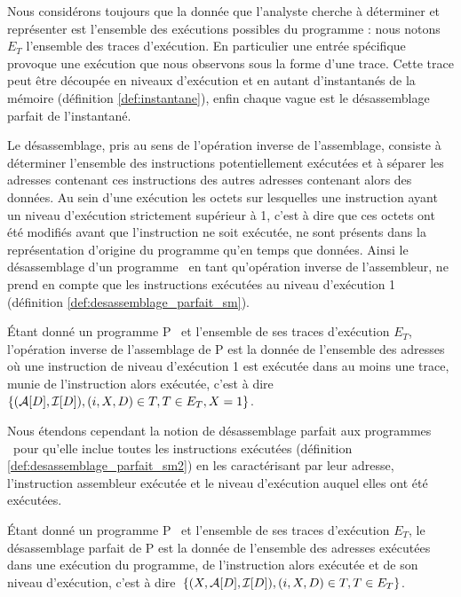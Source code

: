 Nous considérons toujours que la donnée que l'analyste cherche à déterminer et représenter est l'ensemble des exécutions possibles du programme : nous notons $E_T$ l'ensemble des traces d'exécution.
En particulier une entrée spécifique provoque une exécution que nous observons sous la forme d'une trace.
Cette trace peut être découpée en niveaux d'exécution et en autant d'instantanés de la mémoire (définition \ref{def:instantane}), enfin chaque vague est le désassemblage parfait de l'instantané.

Le désassemblage, pris au sens de l'opération inverse de l'assemblage,
consiste à déterminer l'ensemble des instructions potentiellement exécutées et à séparer les adresses contenant ces instructions des
autres adresses contenant alors des données.
Au sein d'une exécution les octets sur lesquelles une instruction ayant
un niveau d'exécution strictement supérieur à 1, c'est à dire que ces
octets ont été modifiés avant que l'instruction ne soit exécutée, ne
sont présents dans la représentation d'origine du programme qu'en temps
que données.
Ainsi le désassemblage d'un programme \sm\, en tant qu'opération inverse de l'assembleur, ne prend en compte
que les instructions exécutées au niveau d'exécution 1
(définition \ref{def:desassemblage_parfait_sm}).

\begin{defi}
 Étant donné un programme P \sm\ et l'ensemble de ses traces d'exécution
$E_T$, l'opération inverse de l'assemblage de P est la donnée de l'ensemble des adresses où une
instruction de niveau d'exécution 1 est exécutée dans au moins une
trace, munie de l'instruction alors exécutée, c'est à dire~$\{(\mathcal A[D], \mathcal I[D]), (i, X, D)\in T, T\in E_T, X=1\}$.
\label{def:desassemblage_parfait_sm}
\end{defi}

Nous étendons cependant la notion de désassemblage parfait aux programmes \sms\ pour qu'elle inclue toutes les instructions exécutées (définition \ref{def:desassemblage_parfait_sm2}) en les caractérisant par leur adresse, l'instruction assembleur exécutée et le niveau d'exécution auquel elles ont été exécutées.

\begin{defi}
 Étant donné un programme P \sm\ et l'ensemble de ses traces d'exécution
$E_T$, le désassemblage parfait de P est la donnée de l'ensemble des adresses exécutées dans une exécution du programme, de l'instruction alors exécutée et de son niveau d'exécution, c'est à dire~$\{(X, \mathcal A[D], \mathcal I[D]), (i, X, D)\in T, T\in E_T\}$.
\label{def:desassemblage_parfait_sm2}
\end{defi}

